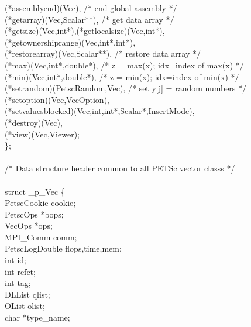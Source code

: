 \documentclass[twoside,12pt]{../sty/report_petsc}
\begin{document}
\begin{tabbing}
       (*assemblyend)(Vec),              /* end global assembly */\\
       (*getarray)(Vec,Scalar**),        /* get data array */\\
       (*getsize)(Vec,int*),(*getlocalsize)(Vec,int*),\\
       (*getownershiprange)(Vec,int*,int*),\\
       (*restorearray)(Vec,Scalar**),    /* restore data array */\\
       (*max)(Vec,int*,double*),         /* z = max(x); idx=index of max(x) */\\
       (*min)(Vec,int*,double*),         /* z = min(x); idx=index of min(x) */\\
       (*setrandom)(PetscRandom,Vec),    /* set y[j] = random numbers */\\
       (*setoption)(Vec,VecOption),\\
       (*setvaluesblocked)(Vec,int,int*,Scalar*,InsertMode),\\
       (*destroy)(Vec),\\
       (*view)(Vec,Viewer);\\
\};\\
\\
/* Data structure header common to all PETSc vector classs */\\
\\
struct \_p\_Vec \{\\
  PetscCookie            cookie;                                  \\
  PetscOps               *bops;                                   \\
  VecOps                 *ops;                                    \\
  MPI\_Comm               comm;\\
  PetscLogDouble         flops,time,mem;                          \\
  int                    id;                                      \\
  int                    refct;                                   \\
  int                    tag;                                     \\
  DLList                 qlist;                                   \\
  OList                  olist;                                   \\
  char                   *type\_name;                              \\

\end{tabbing}
\end{document}
